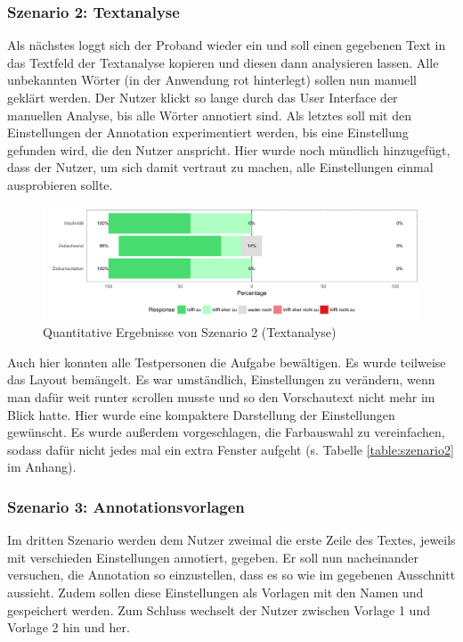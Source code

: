 \subsubsection{Szenario 2: Textanalyse}

Als nächstes loggt sich der Proband wieder ein und soll einen gegebenen Text in das Textfeld der Textanalyse kopieren und diesen dann analysieren lassen. Alle unbekannten Wörter (in der Anwendung rot hinterlegt) sollen nun manuell geklärt werden. Der Nutzer klickt so lange durch das User Interface der manuellen Analyse, bis alle Wörter annotiert sind. Als letztes soll mit den Einstellungen der Annotation experimentiert werden, bis eine Einstellung gefunden wird, die den Nutzer anspricht. Hier wurde noch mündlich hinzugefügt, dass der Nutzer, um sich damit vertraut zu machen, alle Einstellungen einmal ausprobieren sollte.

\begin{figure}[h!]
	\centering
	\includegraphics[width=.8\linewidth]{figures/evaluation/scenario2}
	\caption{Quantitative Ergebnisse von Szenario 2 (Textanalyse)}
	\label{fig:evaluation-sc2}
\end{figure}

Auch hier konnten alle Testpersonen die Aufgabe bewältigen. Es wurde teilweise das Layout bemängelt. Es war umständlich, Einstellungen zu verändern, wenn man dafür weit runter scrollen musste und so den Vorschautext nicht mehr im Blick hatte. Hier wurde eine kompaktere Darstellung der Einstellungen gewünscht. Es wurde außerdem vorgeschlagen, die Farbauswahl zu vereinfachen, sodass dafür nicht jedes mal ein extra Fenster aufgeht (s. Tabelle \ref{table:szenario2} im Anhang).

\subsubsection{Szenario 3: Annotationsvorlagen}

Im dritten Szenario werden dem Nutzer zweimal die erste Zeile des Textes, jeweils mit verschieden Einstellungen annotiert, gegeben. Er soll nun nacheinander versuchen, die Annotation so einzustellen, dass es so wie im gegebenen Ausschnitt aussieht. Zudem sollen diese Einstellungen als Vorlagen mit den Namen  und  gespeichert werden. Zum Schluss wechselt der Nutzer zwischen Vorlage 1 und Vorlage 2 hin und her.

